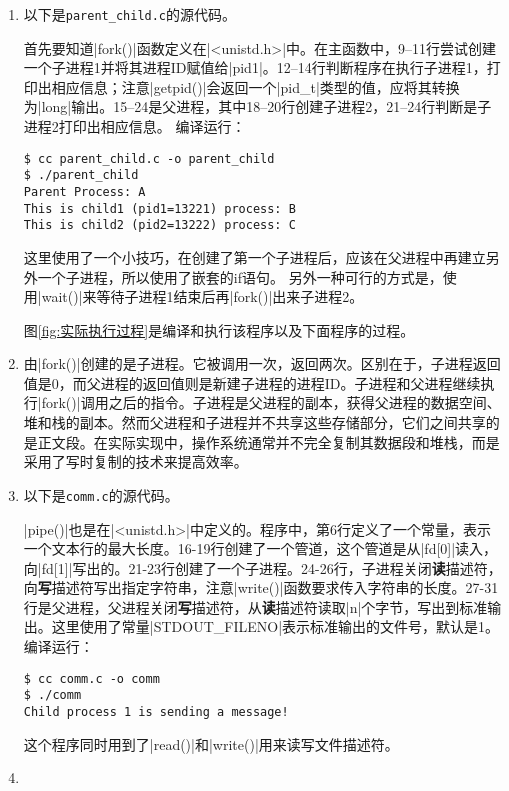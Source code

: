 \documentclass[cs4size,a4paper,nofonts]{ctexart}
\begin{document}
\begin{enumerate}[label={(\arabic*)}]

\item 以下是{\tt parent\_child.c}的源代码。



首先要知道|fork()|函数定义在|<unistd.h>|中。在主函数中，9--11行尝试创建一个子进程1并将其进程ID赋值给|pid1|。12--14行判断程序在执行子进程1，打印出相应信息；注意|getpid()|会返回一个|pid_t|类型的值，应将其转换为|long|输出。15--24是父进程，其中18--20行创建子进程2，21--24行判断是子进程2打印出相应信息。
编译运行：

\begin{Verbatim}
$ cc parent_child.c -o parent_child
$ ./parent_child
Parent Process: A
This is child1 (pid1=13221) process: B
This is child2 (pid2=13222) process: C
\end{Verbatim}

这里使用了一个小技巧，在创建了第一个子进程后，应该在父进程中再建立另外一个子进程，所以使用了嵌套的if语句。
另外一种可行的方式是，使用|wait()|来等待子进程1结束后再|fork()|出来子进程2。

图\ref{fig:实际执行过程}是编译和执行该程序以及下面程序的过程。

\begin{figure}[htp]
\end{figure}

\item 由|fork()|创建的是子进程。它被调用一次，返回两次。区别在于，子进程返回值是0，而父进程的返回值则是新建子进程的进程ID。子进程和父进程继续执行|fork()|调用之后的指令。子进程是父进程的副本，获得父进程的数据空间、堆和栈的副本。然而父进程和子进程并不共享这些存储部分，它们之间共享的是正文段。在实际实现中，操作系统通常并不完全复制其数据段和堆栈，而是采用了写时复制的技术来提高效率。

\item 以下是{\tt comm.c}的源代码。



|pipe()|也是在|<unistd.h>|中定义的。程序中，第6行定义了一个常量，表示一个文本行的最大长度。16-19行创建了一个管道，这个管道是从|fd[0]|读入，向|fd[1]|写出的。21-23行创建了一个子进程。24-26行，子进程关闭{\bf 读}描述符，向{\bf 写}描述符写出指定字符串，注意|write()|函数要求传入字符串的长度。27-31行是父进程，父进程关闭{\bf 写}描述符，从{\bf 读}描述符读取|n|个字节，写出到标准输出。这里使用了常量|STDOUT_FILENO|表示标准输出的文件号，默认是1。
编译运行：

\begin{Verbatim}
$ cc comm.c -o comm
$ ./comm
Child process 1 is sending a message!
\end{Verbatim}

这个程序同时用到了|read()|和|write()|用来读写文件描述符。

\item 	

\end{enumerate}
\end{document}
